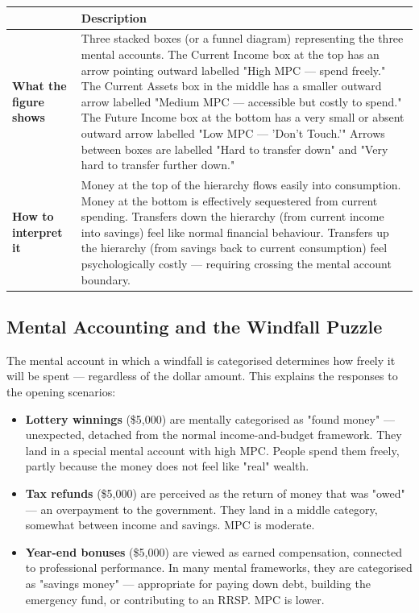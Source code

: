 \documentclass[12pt, letterpaper]{article}
\begin{document}
\begin{table}[H]
\centering
\small
\begin{tabularx}{\linewidth}{lY}
\toprule
 & Description \\
\midrule
\textbf{What the figure shows} & Three stacked boxes (or a funnel diagram) representing the three mental accounts. The Current Income box at the top has an arrow pointing outward labelled "High MPC --- spend freely." The Current Assets box in the middle has a smaller outward arrow labelled "Medium MPC --- accessible but costly to spend." The Future Income box at the bottom has a very small or absent outward arrow labelled "Low MPC --- 'Don't Touch.'" Arrows between boxes are labelled "Hard to transfer down" and "Very hard to transfer further down." \\
\textbf{How to interpret it} & Money at the top of the hierarchy flows easily into consumption. Money at the bottom is effectively sequestered from current spending. Transfers down the hierarchy (from current income into savings) feel like normal financial behaviour. Transfers up the hierarchy (from savings back to current consumption) feel psychologically costly --- requiring crossing the mental account boundary. \\
\bottomrule
\end{tabularx}
\end{table}



\subsection{Mental Accounting and the Windfall Puzzle}


The mental account in which a windfall is categorised determines how freely it will be spent --- regardless of the dollar amount. This explains the responses to the opening scenarios:

\begin{itemize}
\item \textbf{Lottery winnings} (\$5,000) are mentally categorised as "found money" --- unexpected, detached from the normal income-and-budget framework. They land in a special mental account with high MPC. People spend them freely, partly because the money does not feel like "real" wealth.
\item \textbf{Tax refunds} (\$5,000) are perceived as the return of money that was "owed" --- an overpayment to the government. They land in a middle category, somewhat between income and savings. MPC is moderate.
\item \textbf{Year-end bonuses} (\$5,000) are viewed as earned compensation, connected to professional performance. In many mental frameworks, they are categorised as "savings money" --- appropriate for paying down debt, building the emergency fund, or contributing to an RRSP. MPC is lower.
\end{itemize}
\end{document}
